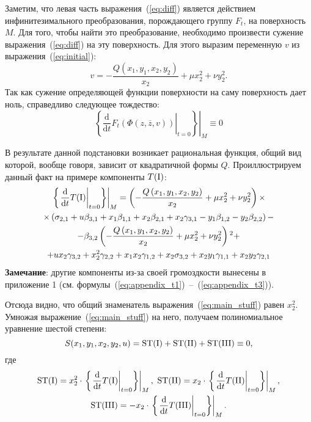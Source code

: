 \documentclass[../main.tex]{subfiles}
\begin{document}
Заметим, что левая часть выражения~(\ref{eq:diff}) является действием инфинитезимального преобразования, порождающего группу $F_t$, на поверхность $M$. Для того, чтобы найти это преобразование, необходимо произвести сужение выражения~(\ref{eq:diff}) на эту поверхность. Для этого выразим переменную $v$ из выражения~(\ref{eq:initial}):
\begin{equation}
v = -\frac{Q(x_1, y_1, x_2, y_2)}{x_2} + \mu x_2^2 + \nu y_2^2.
\end{equation}
Так как сужение определяющей функции поверхности на саму поверхность дает ноль, справедливо следующее тождество:
\begin{equation}\label{eq:main_stuff}
\left. \left\{\left.\frac{\mathrm d}{\mathrm{d}t} F_t\left(\Phi(z, \overline{z}, v)\right)\right|_{t = 0} \right\} \right|_M \equiv 0
\end{equation}

В результате данной подстановки возникает рациональная функция, общий вид которой, вообще говоря, зависит от квадратичной формы $Q$. Проиллюстрируем данный факт на примере компоненты $T(\mathrm{\RN{1}})$:
\begin{multline}
\left.\left\{ \left.\frac{\mathrm d}{\mathrm{d}t}T(\mathrm{\RN{1}})\right|_{t = 0}\right\} \right|_M =
\left(-\frac{Q\left(x_1,y_1,x_2,y_2\right)}{x_2} + \mu x_2^2 + \nu y_2^2\right) \times \\
\times \left( \sigma_{2,1} + u \beta_{3,1} + x_1 \beta_{1,1} + x_2 \beta_{2,1} + x_2 \gamma_{3,1} - y_1 \beta_{1,2} - y_2 \beta_{2,2} \right) - \\
- \beta_{3,2} \left(-\frac{Q\left(x_1,y_1,x_2,y_2\right)}{x_2}+\mu  x_2^2+\nu y_2^2\right){}^2 + \\
+ u x_2 \gamma_{3,2} + x_2^2 \gamma_{2,2} + x_1 x_2 \gamma_{1,2}+x_2 \sigma_{3,2}+x_2 y_1 \gamma_{1,1}+x_2 y_2 \gamma_{2,1}
\end{multline}
\textbf{Замечание}: другие компоненты из-за своей громоздкости вынесены в приложение 1 (см. формулы~(\ref{eq:appendix_t1})~--~(\ref{eq:appendix_t3})).

Отсюда видно, что общий знаменатель выражения~(\ref{eq:main_stuff}) равен $x_2^2$. Умножая выражение~(\ref{eq:main_stuff}) на него, получаем полиномиальное уравнение шестой степени:
\begin{equation*}
S(x_1, y_1, x_2, y_2, u) = \mathrm{ST(\RN{1})} + \mathrm{ST(\RN{2})} + \mathrm{ST(\RN{3})} \equiv 0,
\end{equation*}
где
\begin{gather*}
\mathrm{ST(\RN 1)} = x_2^2 \cdot \left.\left\{ \left.\frac{\mathrm d}{\mathrm{d}t}T(\mathrm{\RN{1}})\right|_{t = 0}\right\} \right|_M , \ \mathrm{ST(\RN 2)} = x_2 \cdot \left.\left\{ \left.\frac{\mathrm d}{\mathrm{d}t}T(\mathrm{\RN{2}})\right|_{t = 0}\right\} \right|_M, \\
\mathrm{ST(\RN 3)} = - x_2 \cdot \left.\left\{ \left.\frac{\mathrm d}{\mathrm{d}t}T(\mathrm{\RN{3}})\right|_{t = 0}\right\} \right|_M.
\end{gather*}
\end{document}

